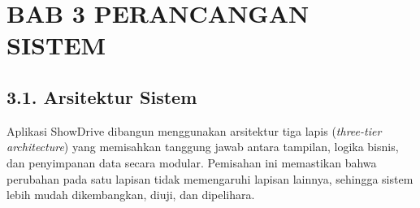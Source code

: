 \documentclass[11pt, a5paper]{article}
\begin{document}
\section*{BAB 3 PERANCANGAN SISTEM}

\subsection*{3.1. Arsitektur Sistem}

Aplikasi ShowDrive dibangun menggunakan arsitektur tiga lapis
(\textit{three-tier architecture}) yang memisahkan tanggung jawab antara
tampilan, logika bisnis, dan penyimpanan data secara modular. Pemisahan ini
memastikan bahwa perubahan pada satu lapisan tidak memengaruhi lapisan lainnya,
sehingga sistem lebih mudah dikembangkan, diuji, dan dipelihara.
\end{document}
